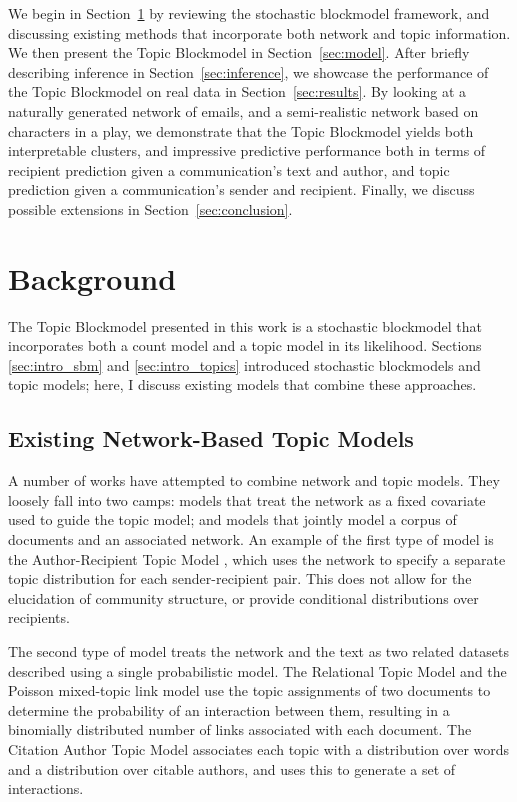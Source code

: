     We begin in Section~\ref{sec:background} by reviewing the stochastic blockmodel framework, and discussing existing methods that incorporate both network and topic information. We then present the Topic Blockmodel in Section~\ref{sec:model}. After briefly describing inference in Section~\ref{sec:inference}, we showcase the performance
    of the Topic Blockmodel on real data in Section~\ref{sec:results}. By looking at a naturally generated network of emails, and a semi-realistic network based on characters in a play, we demonstrate that the Topic Blockmodel yields both interpretable clusters, and impressive predictive performance  both in terms of recipient prediction given a communication's text and author, and topic prediction given a communication's sender and recipient. Finally, we discuss possible extensions in Section~\ref{sec:conclusion}.

\section{Background}\label{sec:background}

    The Topic Blockmodel presented in this work is a stochastic blockmodel that incorporates both a count model and a topic model in its likelihood. Sections \ref{sec:intro_sbm} and \ref{sec:intro_topics} introduced stochastic blockmodels and topic models; here, I discuss existing models that combine these approaches.

    \subsection{Existing Network-Based Topic Models}\label{sec:related}
    
        A number of works have attempted to combine network and topic models. 
        They loosely fall into two camps: models that treat the network as a fixed covariate used to guide the topic model; and models that jointly model a corpus of documents and an associated network. An example of the first type of model is the Author-Recipient Topic Model \citep{mccallum2005}, which uses the network to specify a separate  topic distribution for each sender-recipient pair. This does not allow for the elucidation of community structure, or provide conditional distributions over recipients.
        
        The second type of model treats the network and the text as two related datasets described using a single probabilistic model.
        The Relational Topic Model \citep{rtm} and the Poisson mixed-topic link model \citep{Zhu:Yan:Getoor:Moore:2013} use the topic assignments of two documents to determine the probability of an interaction between them, resulting in a binomially distributed number of links associated with each document. The Citation Author Topic Model \citep{tu2010} associates each topic with a distribution over words and a distribution over citable authors, and uses this to generate a set of interactions.
        
